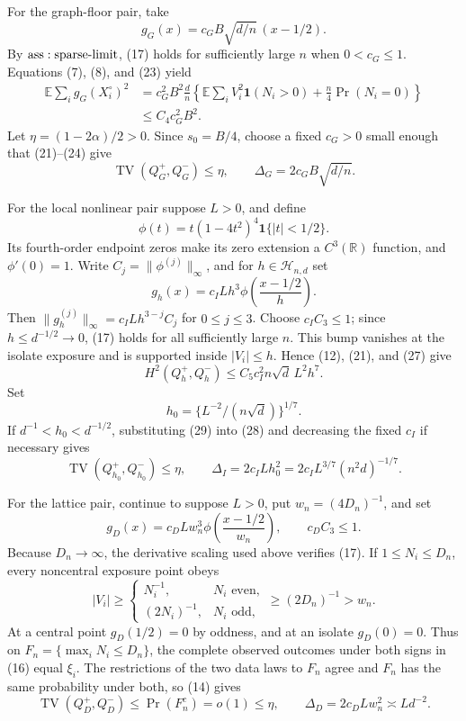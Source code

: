 For the graph-floor pair, take
\[
 g_G(x)=c_GB\sqrt{d/n}\,(x-1/2).
\tag{23}
\]
By \({\rm ass:sparse\text{-}limit}\), (17) holds for sufficiently large \(n\) when \(0<c_G\leq1\).  Equations (7), (8), and (23) yield
\[
\begin{aligned}
 \mathbb E\sum_i g_G(X_i^\circ)^2
 &=c_G^2B^2\frac dn
 \left\{\mathbb E\sum_iV_i^2\mathbf1(N_i>0)
 +\frac n4\Pr(N_i=0)\right\}\\
 &\leq C_4c_G^2B^2.
\end{aligned}
\tag{24}
\]
Let \(\eta=(1-2\alpha)/2>0\).  Since \(s_0=B/4\), choose a fixed \(c_G>0\) small enough that (21)--(24) give
\[
 \operatorname{TV}(Q_G^+,Q_G^-)\leq\eta,
 \qquad \Delta_G=2c_GB\sqrt{d/n}.
\tag{25}
\]

For the local nonlinear pair suppose \(L>0\), and define
\[
 \phi(t)=t(1-4t^2)^4\mathbf1\{|t|<1/2\}.
\tag{26}
\]
Its fourth-order endpoint zeros make its zero extension a \(C^3(\mathbb R)\) function, and \(\phi'(0)=1\).  Write \(C_j=\|\phi^{(j)}\|_\infty\), and for \(h\in\mathcal H_{n,d}\) set
\[
 g_h(x)=c_ILh^3\phi\!\left(\frac{x-1/2}{h}\right).
\tag{27}
\]
Then \(\|g_h^{(j)}\|_\infty=c_ILh^{3-j}C_j\) for \(0\leq j\leq3\).  Choose \(c_IC_3\leq1\); since \(h\leq d^{-1/2}\to0\), (17) holds for all sufficiently large \(n\).  This bump vanishes at the isolate exposure and is supported inside \(|V_i|\leq h\).  Hence (12), (21), and (27) give
\[
 H^2(Q_h^+,Q_h^-)\leq C_5c_I^2n\sqrt d\,L^2h^7.
\tag{28}
\]
Set
\[
 h_0=\{L^{-2}/(n\sqrt d)\}^{1/7}.
\tag{29}
\]
If \(d^{-1}<h_0<d^{-1/2}\), substituting (29) into (28) and decreasing the fixed \(c_I\) if necessary gives
\[
 \operatorname{TV}(Q_{h_0}^+,Q_{h_0}^-)\leq\eta,
 \qquad \Delta_I=2c_ILh_0^2=2c_IL^{3/7}(n^2d)^{-1/7}.
\tag{30}
\]

For the lattice pair, continue to suppose \(L>0\), put \(w_n=(4D_n)^{-1}\), and set
\[
 g_D(x)=c_DLw_n^3\phi\!\left(\frac{x-1/2}{w_n}\right),
 \qquad c_DC_3\leq1.
\tag{31}
\]
Because \(D_n\to\infty\), the derivative scaling used above verifies (17).  If \(1\leq N_i\leq D_n\), every noncentral exposure point obeys
\[
 |V_i|\geq
 \begin{cases}N_i^{-1},&N_i\text{ even},\\(2N_i)^{-1},&N_i\text{ odd},\end{cases}
 \geq(2D_n)^{-1}>w_n.
\tag{32}
\]
At a central point \(g_D(1/2)=0\) by oddness, and at an isolate \(g_D(0)=0\).  Thus on \(F_n=\{\max_iN_i\leq D_n\}\), the complete observed outcomes under both signs in (16) equal \(\xi_i\).  The restrictions of the two data laws to \(F_n\) agree and \(F_n\) has the same probability under both, so (14) gives
\[
 \operatorname{TV}(Q_D^+,Q_D^-)\leq\Pr(F_n^c)=o(1)\leq\eta,
 \qquad \Delta_D=2c_DLw_n^2\asymp Ld^{-2}.
\tag{33}
\]

